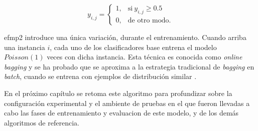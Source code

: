 \begin{equation}
	y_{i,j} =
	\begin{cases}
		1, & \text{si}\ y_{i,j} \geq 0.5 \\
		0, & \text{de otro modo.}
	\end{cases}
\end{equation}

\acrshort{efmp2} introduce una única variación, durante el entrenamiento. Cuando
arriba una instancia $i$, cada uno de los clasificadores base entrena el modelo
$Poisson(1)$ veces con dicha instancia. Esta técnica es conocida como
\textit{online bagging} y se ha probado que se aproxima a la estrategia
tradicional de \textit{bagging} en \textit{batch}, cuando se entrena con
ejemplos de distribución similar \cite{oza_online_2005}.

En el próximo capítulo se retoma este algoritmo para profundizar sobre la
configuración experimental y el ambiente de pruebas en el que fueron llevadas a
cabo las fases de entrenamiento y evaluacion de este modelo, y de los demás
algoritmos de referencia.

